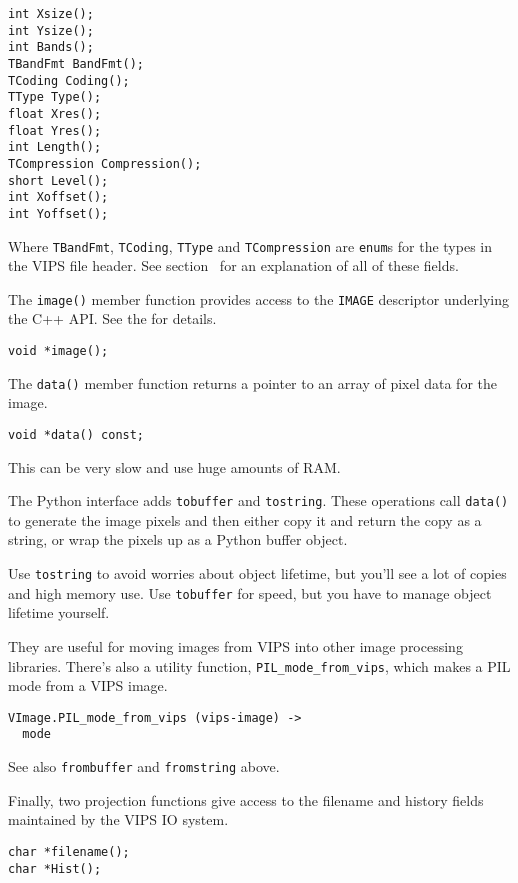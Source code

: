 \begin{verbatim}
int Xsize();
int Ysize();
int Bands();
TBandFmt BandFmt();
TCoding Coding();
TType Type();
float Xres();
float Yres();
int Length();
TCompression Compression();
short Level();
int Xoffset();
int Yoffset();
\end{verbatim}

\noindent
Where \verb+TBandFmt+, \verb+TCoding+, \verb+TType+ and \verb+TCompression+
are \verb+enum+s for the types in the VIPS file header. See section~ for an explanation of all of these fields.

The \verb+image()+ member function provides access to the \verb+IMAGE+
descriptor underlying the C++ API. See the  for details.

\begin{verbatim}
void *image();
\end{verbatim}

The \verb+data()+ member function returns a pointer to an array of pixel data
for the image. 

\begin{verbatim}
void *data() const;
\end{verbatim}

\noindent
This can be very slow and use huge amounts of RAM.

The Python interface adds \verb+tobuffer+ and \verb+tostring+. These
operations call \verb+data()+ to generate the image pixels and then either
copy it and return the copy as a string, or wrap the pixels up as a Python
buffer object.

Use \verb+tostring+ to avoid worries about object lifetime, but you'll see a
lot of copies and high memory use. Use \verb+tobuffer+ for speed, but you
have to manage object lifetime yourself.

They are useful for moving images from VIPS into other image processing
libraries. There's also a utility function, \verb+PIL_mode_from_vips+, which
makes a PIL mode from a VIPS image.

\begin{verbatim}
VImage.PIL_mode_from_vips (vips-image) -> 
  mode
\end{verbatim}

See also \verb+frombuffer+ and \verb+fromstring+ above.

Finally, two projection functions give access to the filename and history
fields maintained by the VIPS IO system.

\begin{verbatim}
char *filename();
char *Hist();
\end{verbatim}

